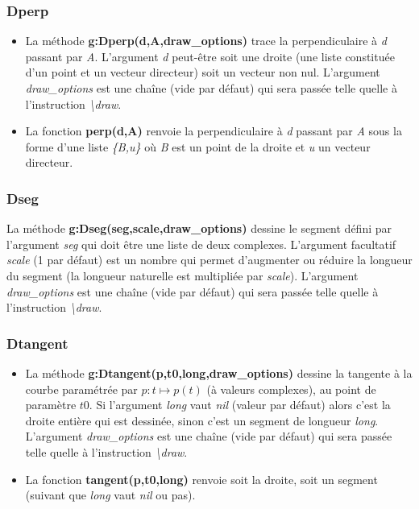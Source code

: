 \subsubsection{Dperp}
\begin{itemize}
    \item La méthode \textbf{g:Dperp(d,A,draw\_options)} trace la perpendiculaire à \emph{d} passant par \emph{A}. L'argument \emph{d} peut-être soit une droite (une liste constituée d'un point et un vecteur directeur) soit un vecteur non nul. L'argument \emph{draw\_options} est une chaîne (vide par défaut) qui sera passée  telle quelle à l'instruction \emph{\textbackslash draw}.
    \item La fonction \textbf{perp(d,A)} renvoie la perpendiculaire à \emph{d} passant par \emph{A} sous la forme d'une liste \emph{\{B,u\}} où \emph{B} est un point de la droite et \emph{u} un vecteur directeur.
\end{itemize}

\subsubsection{Dseg}
La méthode \textbf{g:Dseg(seg,scale,draw\_options)} dessine le segment défini par l'argument \emph{seg} qui doit être une liste de deux complexes. L'argument facultatif \emph{scale} (1 par défaut) est un nombre qui permet d'augmenter ou réduire la longueur du segment (la longueur naturelle est multipliée par \emph{scale}). L'argument \emph{draw\_options} est une chaîne (vide par défaut) qui sera passée telle quelle à l'instruction \emph{\textbackslash draw}.

\subsubsection{Dtangent}
\begin{itemize}
    \item La méthode \textbf{g:Dtangent(p,t0,long,draw\_options)} dessine la tangente à la courbe paramétrée par \(p: t \mapsto p(t)\) (à valeurs complexes), au point de paramètre \(t0\). Si l'argument \emph{long} vaut \emph{nil} (valeur par défaut) alors c'est la droite entière qui est dessinée, sinon c'est un segment de longueur \emph{long}. L'argument \emph{draw\_options} est une chaîne (vide par défaut) qui sera passée telle quelle à l'instruction \emph{\textbackslash draw}.
    \item La fonction \textbf{tangent(p,t0,long)} renvoie soit la droite, soit un segment (suivant que \emph{long} vaut \emph{nil} ou pas).
\end{itemize}

